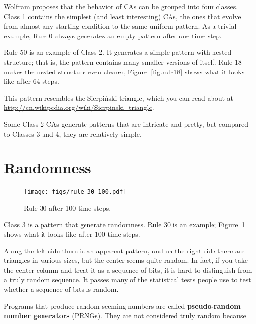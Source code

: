 \documentclass[10pt]{book}
\begin{document}
Wolfram proposes that the behavior of CAs can be grouped
into four classes.  Class 1 contains the simplest (and least
interesting) CAs, the ones that evolve from almost any starting
condition to the same uniform pattern.  As a trivial example,
Rule 0 always generates an empty pattern after one time step.

Rule 50 is an example of Class 2.  It generates a simple pattern with
nested structure; that is, the pattern contains many smaller versions
of itself.  Rule 18 makes the nested structure even clearer;
Figure~\ref{fig.rule18} shows what it looks like after 64 steps.
 
This pattern resembles the Sierpi\'{n}ski triangle, which
you can read about at \url{http://en.wikipedia.org/wiki/Sierpinski_triangle}.

Some Class 2 CAs generate patterns that are intricate and
pretty, but compared to Classes 3 and 4, they are relatively
simple.


\section{Randomness}

\begin{figure}
\centerline{\texttt{[image: figs/rule-30-100.pdf]}}
\caption{Rule 30 after 100 time steps.\label{fig.rule30}}
\end{figure}

Class 3 is a pattern that generate randomness.
Rule 30 is an example; Figure~\ref{fig.rule30} shows what it looks like
after 100 time steps.

Along the left side there is an apparent pattern, and on the right
side there are triangles in various sizes, but the center seems
quite random.  In fact, if you take the center column and treat it as a
sequence of bits, it is hard to distinguish from a truly random
sequence.  It passes many of the statistical tests people use
to test whether a sequence of bits is random.

Programs that produce random-seeming numbers are called
{\bf pseudo-random number generators} (PRNGs).  They are not considered
truly random because
\end{document}
